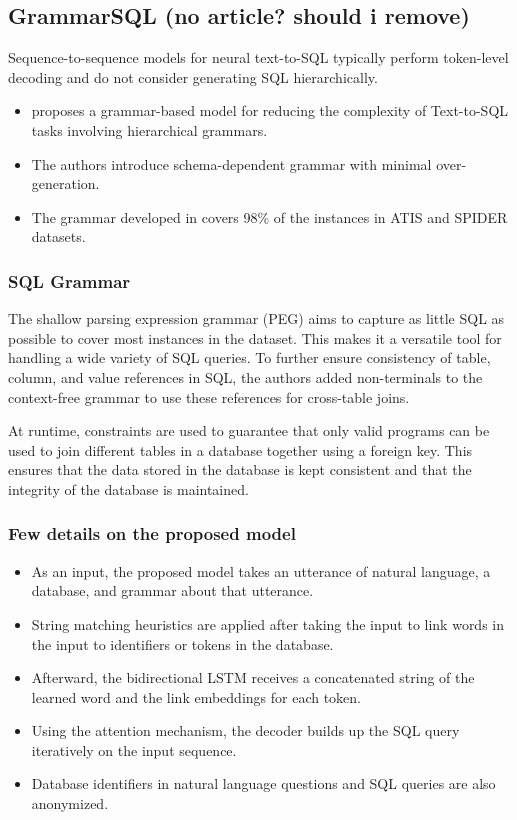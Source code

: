 \subsection{GrammarSQL (no article? should i remove)}

Sequence-to-sequence models for neural text-to-SQL typically perform token-level decoding and do not consider generating SQL hierarchically.

\begin{itemize}
    \item \cite{xu_sqlnet_2017} proposes a grammar-based model for reducing the complexity of Text-to-SQL tasks involving hierarchical grammars.
    \item The authors introduce schema-dependent grammar with minimal over-generation.
    \item The grammar developed in \cite{xu_sqlnet_2017} covers 98\% of the instances in ATIS and SPIDER datasets.
\end{itemize}

\subsubsection{SQL Grammar}

The shallow parsing expression grammar (PEG) aims to capture as little SQL as possible to cover most instances in the dataset. This makes it a versatile tool for handling a wide variety of SQL queries. To further ensure consistency of table, column, and value references in SQL, the authors added non-terminals to the context-free grammar to use these references for cross-table joins.

At runtime, constraints are used to guarantee that only valid programs can be used to join different tables in a database together using a foreign key. This ensures that the data stored in the database is kept consistent and that the integrity of the database is maintained.

\subsubsection{Few details on the proposed model}

\begin{itemize}
    \item As an input, the proposed model takes an utterance of natural language, a database, and grammar about that utterance.
    \item String matching heuristics are applied after taking the input to link words in the input to identifiers or tokens in the database.
    \item Afterward, the bidirectional LSTM receives a concatenated string of the learned word and the link embeddings for each token.
    \item Using the attention mechanism, the decoder builds up the SQL query iteratively on the input sequence.
    \item Database identifiers in natural language questions and SQL queries are also anonymized.
\end{itemize}

